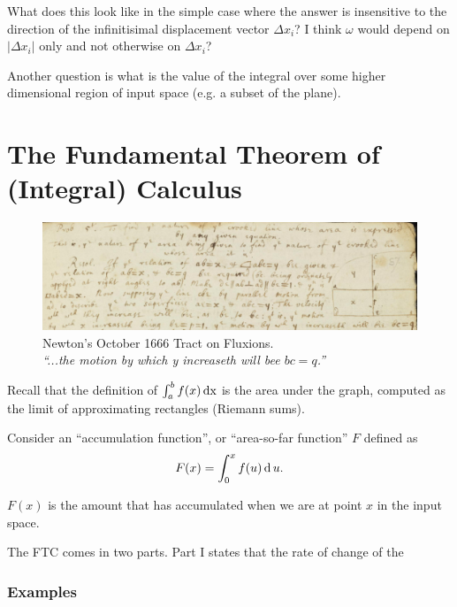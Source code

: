\documentclass[12pt]{article}
\begin{document}
What does this look like in the simple case where the answer is insensitive to
the direction of the infinitisimal displacement vector $\Delta x_i$? I think
$\omega$ would depend on $|\Delta x_i|$ only and not otherwise on $\Delta x_i$?

Another question is what is the value of the integral over some higher
dimensional region of input space (e.g. a subset of the plane).

\newpage
\section{The Fundamental Theorem of (Integral) Calculus}

\begin{figure}[h]
\centering
\includegraphics[width=500pt]{img/newton-october-1666-tract-ftc.png}
\captionsetup{labelformat=empty,justification=centering}
\caption[xxx]{Newton's October 1666 Tract on Fluxions.\\
  \emph{``...the motion by which y increaseth will bee $bc = q$.''}}
\end{figure}

Recall that the definition of $\int_a^b f(x) \operatorname{\text{dx}}$ is the area under the graph,
computed as the limit of approximating rectangles (Riemann sums).

Consider an ``accumulation function'', or ``area-so-far function'' $F$ defined
as
\begin{align*}
  F(x) = \int_0^x f(u) \operatorname{\text{d}} u.
\end{align*}

$F(x)$ is the amount that has accumulated when we are at point $x$ in the
input space.

The FTC comes in two parts. Part I states that the rate of change of the




\subsubsection*{Examples}
\end{document}
